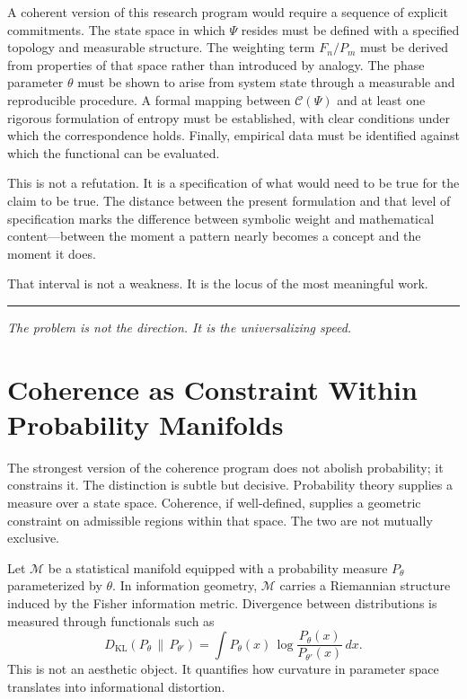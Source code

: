 \documentclass[12pt]{article}
\begin{document}
A coherent version of this research program would require a sequence of explicit commitments. The state space in which $\Psi$ resides must be defined with a specified topology and measurable structure. The weighting term $F_n / P_m$ must be derived from properties of that space rather than introduced by analogy. The phase parameter $\theta$ must be shown to arise from system state through a measurable and reproducible procedure. A formal mapping between $\mathcal{C}(\Psi)$ and at least one rigorous formulation of entropy must be established, with clear conditions under which the correspondence holds. Finally, empirical data must be identified against which the functional can be evaluated.

This is not a refutation. It is a specification of what would need to be true for the claim to be true. The distance between the present formulation and that level of specification marks the difference between symbolic weight and mathematical content—between the moment a pattern nearly becomes a concept and the moment it does.

That interval is not a weakness. It is the locus of the most meaningful work.

\bigskip
\hrule
\bigskip

\begin{center}
\small\itshape
The problem is not the direction. It is the universalizing speed.
\end{center}

\section{Coherence as Constraint Within Probability Manifolds}

The strongest version of the coherence program does not abolish probability; it constrains it. The distinction is subtle but decisive. Probability theory supplies a measure over a state space. Coherence, if well-defined, supplies a geometric constraint on admissible regions within that space. The two are not mutually exclusive.

Let $\mathcal{M}$ be a statistical manifold equipped with a probability measure $P_\theta$ parameterized by $\theta$. In information geometry, $\mathcal{M}$ carries a Riemannian structure induced by the Fisher information metric. Divergence between distributions is measured through functionals such as
\[
  D_{\mathrm{KL}}(P_\theta \,\|\, P_{\theta'}) = 
  \int P_\theta(x)\,\log\frac{P_\theta(x)}{P_{\theta'}(x)}\,dx.
\]
This is not an aesthetic object. It quantifies how curvature in parameter space translates into informational distortion.
\end{document}
